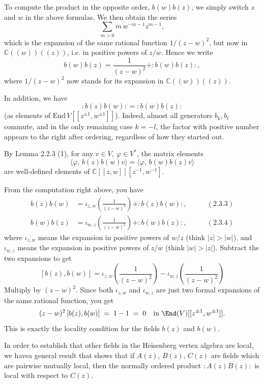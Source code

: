 \documentclass[12pt]{article}
\begin{document}
To compute the product in the opposite order, \(b(w)b(z)\),
we simply switch \(z\) and \(w\) in the above formulas.
We then obtain the series
\begin{equation}\label{2.3.3}
    \sum_{m>0} m\,w^{-m-1}z^{m-1},
\end{equation}
which is the expansion of the same rational function \(1/(z-w)^2\),
but now in \(\mathbb{C}((w))((z))\), i.e. in positive powers of \(z/w\).
Hence we write
\begin{equation}\label{2.3.4}
    b(w)b(z)
    = \frac{1}{(z-w)^2} + :b(w)b(z):,
\end{equation}
where \(1/(z-w)^2\) now stands for its expansion in \(\mathbb{C}((w))((z))\).

In addition, we have
\[
    :b(z)b(w): = :b(w)b(z):
\]
(as elements of \(\mathrm{End}\,V[[z^{\pm1},w^{\pm1}]]\)).
Indeed, almost all generators \(b_k,b_l\) commute, and in the only remaining case \(k=-l\),
the factor with positive number appears to the right after ordering, regardless of how they started out.

By Lemma 2.2.3 (1), for any \(v\in V,\ \varphi\in V^*\),
the matrix elements
\[
    \langle \varphi,\, b(z)b(w)v\rangle = \langle \varphi,\, b(w)b(z)v\rangle
\]
are well-defined elements of \(\mathbb{C}[[z,w]][z^{-1},w^{-1}]\).

From the computation right above, you have
\begin{align*}
    b(z)b(w) & = \iota_{z,w}\!\left(\frac{1}{(z-w)^2}\right) + :b(z)b(w):, \qquad & (2.3.3) \\
    b(w)b(z) & = \iota_{w,z}\!\left(\frac{1}{(z-w)^2}\right) + :b(w)b(z):, \qquad & (2.3.4)
\end{align*}
where $\iota_{z,w}$ means the expansion in positive powers of $w/z$ (think $|z|>|w|$), and $\iota_{w,z}$ means the expansion in positive powers of $z/w$ (think $|w|>|z|$). Subtract the two expansions to get
\[
    [b(z),b(w)]
    = \iota_{z,w}\!\left(\frac{1}{(z-w)^2}\right) -
    \iota_{w,z}\!\left(\frac{1}{(z-w)^2}\right)\]
Multiply by $(z-w)^2$. Since both $\iota_{z,w}$ and $\iota_{w,z}$ are just two formal expansions of the same rational function, you get
\[
    (z-w)^2\,[b(z),b(w)] \;=\; 1-1 \;=\; 0
    \quad\text{in }\End(V)[[z^{\pm1},w^{\pm1}]].
\]
This is exactly the locality condition for the fields $b(z)$ and $b(w)$.

In order to establish that other fields in the Heisenberg vertex algebra are local,
we havea general result that shows that if $A(z)$, $B(z)$, $C(z)$ are fields which are
pairwise mutually local, then the normally ordered product $:A(z)B(z):$ is local
with respect to $C(z)$.
\end{document}
